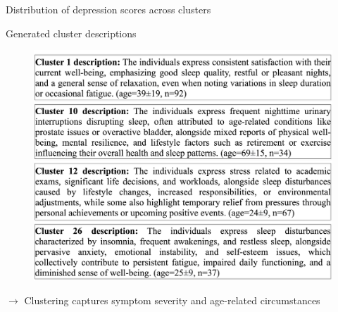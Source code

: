 \documentclass[10pt]{beamer}
\begin{document}
\begin{frame}{Distribution of depression scores across clusters}
\end{frame}

\begin{frame}{Generated cluster descriptions}
  \begin{figure}
    \centering
    \includegraphics[scale=0.25]{img/topic_modeling/boxplot_description/popgen_description_larger_descriptions.png}
    \label{fig:popgen_description}
\end{figure}

\pause

$\rightarrow$ Clustering captures symptom severity and age-related circumstances

\end{frame}
\end{document}
